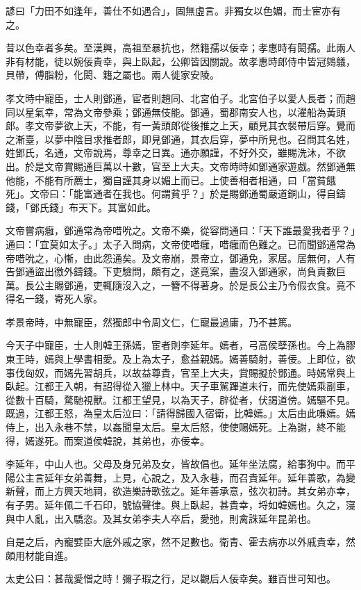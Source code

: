 
\begin{pinyinscope}
諺曰「力田不如逢年，善仕不如遇合」，固無虛言。非獨女以色媚，而士宦亦有之。

昔以色幸者多矣。至漢興，高祖至暴抗也，然籍孺以佞幸；孝惠時有閎孺。此兩人非有材能，徒以婉佞貴幸，與上臥起，公卿皆因關說。故孝惠時郎侍中皆冠鵕鸃，貝帶，傅脂粉，化閎、籍之屬也。兩人徙家安陵。

孝文時中寵臣，士人則鄧通，宦者則趙同、北宮伯子。北宮伯子以愛人長者；而趙同以星氣幸，常為文帝參乘；鄧通無伎能。鄧通，蜀郡南安人也，以濯船為黃頭郎。孝文帝夢欲上天，不能，有一黃頭郎從後推之上天，顧見其衣裻帶后穿。覺而之漸臺，以夢中陰目求推者郎，即見鄧通，其衣后穿，夢中所見也。召問其名姓，姓鄧氏，名通，文帝說焉，尊幸之日異。通亦願謹，不好外交，雖賜洗沐，不欲出。於是文帝賞賜通巨萬以十數，官至上大夫。文帝時時如鄧通家遊戲。然鄧通無他能，不能有所薦士，獨自謹其身以媚上而已。上使善相者相通，曰「當貧餓死」。文帝曰：「能富通者在我也。何謂貧乎？」於是賜鄧通蜀嚴道銅山，得自鑄錢，「鄧氏錢」布天下。其富如此。

文帝嘗病癰，鄧通常為帝唶吮之。文帝不樂，從容問通曰：「天下誰最愛我者乎？」通曰：「宜莫如太子。」太子入問病，文帝使唶癰，唶癰而色難之。已而聞鄧通常為帝唶吮之，心慚，由此怨通矣。及文帝崩，景帝立，鄧通免，家居。居無何，人有告鄧通盜出徼外鑄錢。下吏驗問，頗有之，遂竟案，盡沒入鄧通家，尚負責數巨萬。長公主賜鄧通，吏輒隨沒入之，一簪不得著身。於是長公主乃令假衣食。竟不得名一錢，寄死人家。

孝景帝時，中無寵臣，然獨郎中令周文仁，仁寵最過庸，乃不甚篤。

今天子中寵臣，士人則韓王孫嫣，宦者則李延年。嫣者，弓高侯孽孫也。今上為膠東王時，嫣與上學書相愛。及上為太子，愈益親嫣。嫣善騎射，善佞。上即位，欲事伐匈奴，而嫣先習胡兵，以故益尊貴，官至上大夫，賞賜擬於鄧通。時嫣常與上臥起。江都王入朝，有詔得從入獵上林中。天子車駕蹕道未行，而先使嫣乘副車，從數十百騎，騖馳視獸。江都王望見，以為天子，辟從者，伏謁道傍。嫣驅不見。既過，江都王怒，為皇太后泣曰：「請得歸國入宿衛，比韓嫣。」太后由此嗛嫣。嫣侍上，出入永巷不禁，以姦聞皇太后。皇太后怒，使使賜嫣死。上為謝，終不能得，嫣遂死。而案道侯韓說，其弟也，亦佞幸。

李延年，中山人也。父母及身兄弟及女，皆故倡也。延年坐法腐，給事狗中。而平陽公主言延年女弟善舞，上見，心說之，及入永巷，而召貴延年。延年善歌，為變新聲，而上方興天地祠，欲造樂詩歌弦之。延年善承意，弦次初詩。其女弟亦幸，有子男。延年佩二千石印，號協聲律。與上臥起，甚貴幸，埒如韓嫣也。久之，寖與中人亂，出入驕恣。及其女弟李夫人卒后，愛弛，則禽誅延年昆弟也。

自是之后，內寵嬖臣大底外戚之家，然不足數也。衛青、霍去病亦以外戚貴幸，然頗用材能自進。

太史公曰：甚哉愛憎之時！彌子瑕之行，足以觀后人佞幸矣。雖百世可知也。


\end{pinyinscope}